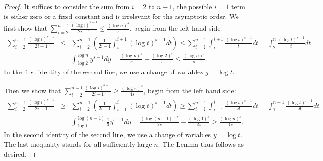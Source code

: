 \documentclass[twoside,11pt]{article}
\theoremstyle{remark}
\begin{document}
\begin{proof}
It suffices to consider the sum from $i=2$ to $n-1$, the possible $i=1$ term is either zero or a fixed constant and is irrelevant for the asymptotic order.
We first show that $\sum_{i=2}^{n-1} \frac{\left(\log i\right)^{s-1}}{2i-1} \le \frac{(\log n)^s}{s}$, begin from the left hand side:
%
\begingroup
\begin{eqnarray*}
\sum_{i=2}^{n-1} \frac{\left(\log i\right)^{s-1}}{2i-1} &\le  &  \sum_{i=2}^{n-1} \left(\frac{1}{2i-1} \int^{i+1}_i \left(\log t\right)^{s-1}dt \right)\le \sum_{i=2}^{n-1} \int^{i+1}_i \frac{ \left(\log t\right)^{s-1}}{t}dt= \int^n_2 \frac{ \left(\log t\right)^{s-1}}{t}dt\\
&=& \int^{\log n}_{\log 2}  y^{s-1}d y=\frac{\left(\log n\right)^{s}}{s}-\frac{\left(\log 2\right)^{s}}{s} \leq \frac{(\log n)^s}{s}.
\end{eqnarray*}
\endgroup
%
In the first identity of the second line, we use a change of variables $y = \log t$. 

Then we show that $\sum_{i=2}^{n-1} \frac{\left(\log i\right)^{s-1}}{2i-1} \ge \frac{(\log n)^s}{4s}$, begin from the left hand side:
%
\begingroup
\begin{eqnarray*}
\sum_{i=2}^{n-1} \frac{\left(\log i\right)^{s-1}}{2i-1} &\ge & \sum_{i=2}^{n-1} \left(\frac{1}{2i-1} \int^{i}_{i-1} \left(\log t\right)^{s-1}dt \right)\ge \sum_{i=2}^{n-1} \int^{i}_{i-1} \frac{ \left(\log t\right)^{s-1}}{3t}dt = \int^{n-1}_1 \frac{ \left(\log t\right)^{s-1}}{3t}dt\\
&=& \int^{\log \left(n-1\right)}_{\log 1} \frac{1}{3} y^{s-1}d y=\frac{\left(\log \left(n-1\right)\right)^{s}}{3s}-\frac{\left(\log 1\right)^{s}}{3s} \geq \frac{(\log n)^s}{4s}.
\end{eqnarray*}
\endgroup
%
In the second identity of the second line, we use a change of variables $y = \log t$. The last inequality stands for all sufficiently large $n$.
The Lemma thus follows as desired. 
\end{proof}



\end{document}
